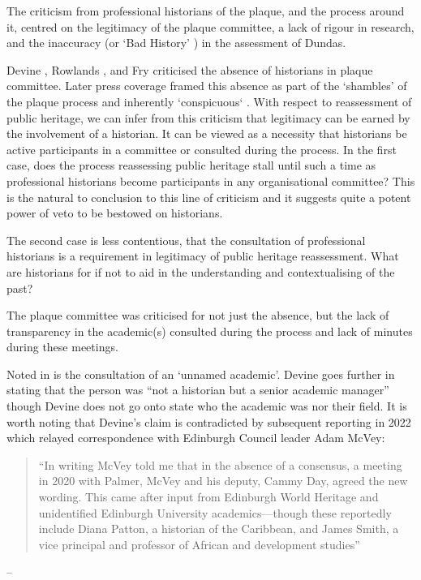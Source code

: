 \documentclass{scrartcl}
\renewcommand{\cite}{\parencite}
\begin{document}
The criticism from professional historians of the plaque, and the process around it, centred on the legitimacy of the plaque committee, a lack of rigour in research, and the inaccuracy (or `Bad History' \cite{mccarthy_2022_1}) in the assessment of Dundas.

Devine \cite{devine_2020}, Rowlands \cite{rowlands_2021}, and Fry \cite{fry_2020} criticised the absence of historians in plaque committee.
Later press coverage framed this absence as part of the `shambles' of the plaque process and inherently `conspicuous` \cite{scotsman_2022}.
With respect to reassessment of public heritage, we can infer from this criticism that legitimacy can be earned by the involvement of a historian. It can be viewed as a necessity that historians be active participants in a committee or consulted during the process.
In the first case, does the process reassessing public heritage stall until such a time as professional historians become participants in any organisational committee?
This is the natural to conclusion to this line of criticism and it suggests quite a potent power of veto to be bestowed on historians.

The second case is less contentious, that the consultation of professional historians is a requirement in legitimacy of public heritage reassessment. What are historians for if not to aid in the understanding and contextualising of the past?

The plaque committee was criticised for not just the absence, but the lack of transparency in the academic(s) consulted during the process and lack of minutes during these meetings.

Noted in \cite{devine_2020,scotsman_2022,rowlands_2021,fry_2020} is the consultation of an `unnamed academic'. Devine goes further in stating that the person was ``not a historian but a senior academic manager'' \cite{devine_2020} though Devine does not go onto state who the academic was nor their field. 
It is worth noting that Devine's claim is contradicted by subsequent reporting in 2022 which relayed correspondence with Edinburgh Council leader Adam McVey:

\begin{quotation}
    ``In writing McVey told me that in the absence of a consensus, a meeting in 2020 with Palmer, McVey and his deputy, Cammy Day, agreed the new wording. This came after input from Edinburgh World Heritage and unidentified Edinburgh University academics—though these reportedly include Diana Patton, a historian of the Caribbean, and James Smith, a vice principal and professor of African and development studies''
\end{quotation}
\begin{flushright}
-- \cite{lloyd_2022}
\end{flushright}
\end{document}
